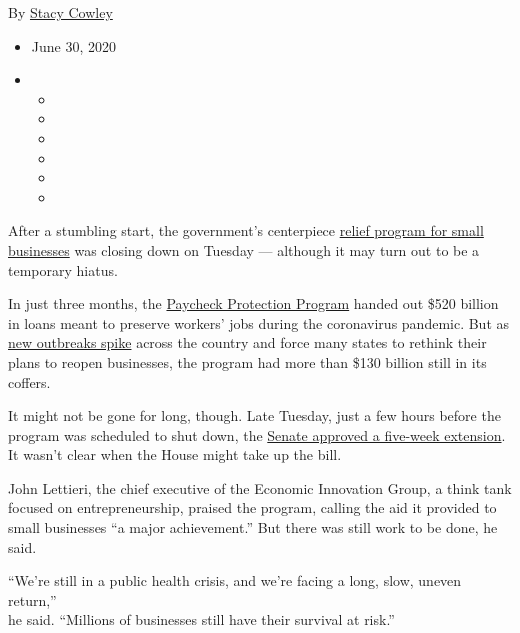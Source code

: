 By \href{https://www.nytimes3xbfgragh.onion/by/stacy-cowley}{Stacy
Cowley}

\begin{itemize}
\item
  June 30, 2020
\item
  \begin{itemize}
  \item
  \item
  \item
  \item
  \item
  \item
  \end{itemize}
\end{itemize}

After a stumbling start, the government's centerpiece
\href{https://www.nytimes3xbfgragh.onion/2020/07/06/us/ppp-small-business-loans.html}{relief
program for small businesses} was closing down on Tuesday --- although
it may turn out to be a temporary hiatus.

In just three months, the
\href{https://www.nytimes3xbfgragh.onion/2020/06/30/us/politics/ppp-extension.html}{Paycheck
Protection Program} handed out \$520 billion in loans meant to preserve
workers' jobs during the coronavirus pandemic. But as
\href{https://www.nytimes3xbfgragh.onion/2020/06/27/us/after-asking-americans-to-sacrifice-in-shutdown-leaders-failed-to-control-virus.html?action=click\&module=Spotlight\&pgtype=Homepage}{new
outbreaks spike} across the country and force many states to rethink
their plans to reopen businesses, the program had more than \$130
billion still in its coffers.

It might not be gone for long, though. Late Tuesday, just a few hours
before the program was scheduled to shut down, the
\href{https://www.nytimes3xbfgragh.onion/2020/06/30/us/politics/coronavirus-senate-small-business-program.html}{Senate
approved a five-week extension}. It wasn't clear when the House might
take up the bill.

John Lettieri, the chief executive of the Economic Innovation Group, a
think tank focused on entrepreneurship, praised the program, calling the
aid it provided to small businesses ``a major achievement.'' But there
was still work to be done, he said.

``We're still in a public health crisis, and we're facing a long, slow,
uneven return,''\\
he said. ``Millions of businesses still have their survival at risk.''

